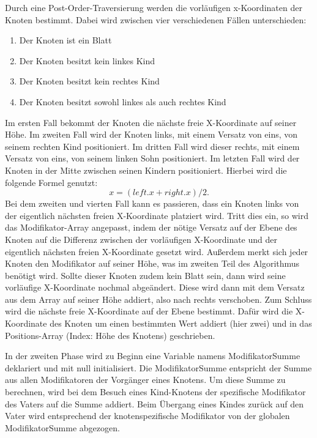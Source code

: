 Durch eine Post-Order-Traversierung werden die vorläufigen x-Koordinaten der Knoten bestimmt.
Dabei wird zwischen vier verschiedenen Fällen unterschieden:
\begin{enumerate}
	\item Der Knoten ist ein Blatt
	\item Der Knoten besitzt kein linkes Kind
	\item Der Knoten besitzt kein rechtes Kind
	\item Der Knoten besitzt sowohl linkes als auch rechtes Kind
\end{enumerate}

Im ersten Fall bekommt der Knoten die nächste freie X-Koordinate auf seiner Höhe. 
Im zweiten Fall wird der Knoten links, mit einem Versatz von eins, von seinem rechten Kind positioniert.
Im dritten Fall wird dieser rechts, mit einem Versatz von eins, von seinem linken Sohn positioniert. Im letzten Fall wird der Knoten
in der Mitte zwischen seinen Kindern positioniert. Hierbei wird die folgende Formel genutzt: $$x = (left.x + right.x) / 2.$$
Bei dem zweiten und vierten Fall kann es passieren, dass ein Knoten links von der eigentlich nächsten freien X-Koordinate platziert wird.
Tritt dies ein, so wird das Modifikator-Array angepasst, indem der nötige Versatz auf der Ebene des Knoten auf die Differenz zwischen
der vorläufigen X-Koordinate und der eigentlich nächsten freien X-Koordinate gesetzt wird. Außerdem merkt sich jeder Knoten den Modifikator
auf seiner Höhe, was im zweiten Teil des Algorithmus benötigt wird. Sollte dieser Knoten zudem kein Blatt sein, dann
wird seine vorläufige X-Koordinate nochmal abgeändert. Diese wird dann mit dem Versatz aus dem Array auf seiner Höhe addiert, also nach rechts
verschoben. Zum Schluss wird die nächste freie X-Koordinate auf der Ebene bestimmt. Dafür wird die X-Koordinate des Knoten um einen 
bestimmten Wert addiert (hier zwei) und in das Positions-Array (Index: Höhe des Knotens) geschrieben.

In der zweiten Phase wird zu Beginn eine Variable namens \glqq ModifikatorSumme\grqq{} deklariert und mit null initialisiert. 
Die ModifikatorSumme entspricht der Summe aus allen Modifikatoren der Vorgänger eines Knotens. Um diese Summe zu berechnen, 
wird bei dem Besuch eines Kind-Knotens der spezifische Modifikator des Vaters auf die Summe addiert. Beim Übergang eines Kindes 
zurück auf den Vater wird entsprechend der knotenspezifische Modifikator von der globalen ModifikatorSumme abgezogen.

